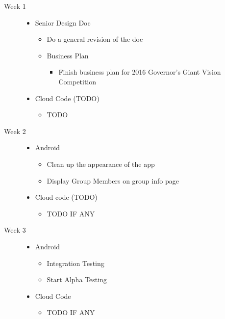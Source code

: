 \documentclass[11pt]{article}
\begin{document}
\begin{description}
	\item[Week 1] \hfill
		\begin{itemize}
		\item Senior Design Doc
		\begin{itemize}
			\item Do a general revision of the doc
		\end{itemize}
		\begin{itemize}
		\item Business Plan
		\begin{itemize}
			\item Finish business plan for 2016 Governor's Giant Vision Competition
		\end{itemize}
		\end{itemize}
		\item Cloud Code (TODO)
		\begin{itemize}
			\item TODO
		\end{itemize}
	\end{itemize}
	
  \item[Week 2] \hfill
		\begin{itemize}
		\item Android
		\begin{itemize}
			\item Clean up the appearance of the app
			\item Display Group Members on group info page
		\end{itemize}
		\item Cloud code (TODO)
		\begin{itemize}
			\item TODO IF ANY
		\end{itemize}
	\end{itemize}
  
  \item[Week 3] \hfill
		\begin{itemize}
		\item Android
		\begin{itemize}
			\item Integration Testing
			\item Start Alpha Testing
		\end{itemize}
		\item Cloud Code
		\begin{itemize}
			\item TODO IF ANY
		\end{itemize}
	\end{itemize}
\end{description}
\end{document}
